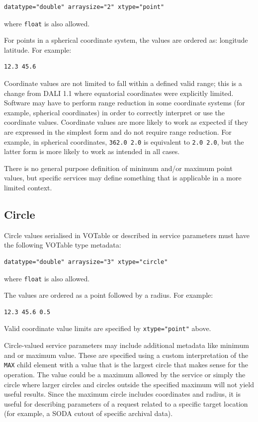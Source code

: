 \documentclass[11pt,letter]{ivoa}
\begin{document}
\begin{verbatim}
datatype="double" arraysize="2" xtype="point"
\end{verbatim}
\noindent where \verb|float| is also allowed.

For points in a spherical coordinate system, the values are ordered as: longitude latitude. For example:

\begin{verbatim}
12.3 45.6
\end{verbatim}

Coordinate values are not limited to fall within a defined valid range; this is a change from
DALI 1.1 where equatorial coordinates were explicitly limited. Software may have
to perform range reduction in some coordinate systems (for example, spherical coordinates) in
order to correctly interpret or use the coordinate values. Coordinate values are more likely to
work as expected if they are expressed in the simplest form and do not require range reduction.
For example, in spherical coordinates, \verb|362.0 2.0| is equivalent to \verb|2.0 2.0|, but the
latter form is more likely to work as intended in all cases.

There is no general purpose definition of minimum and/or maximum point values, but
specific services may define something that is applicable in a more limited context.

\subsection{Circle}
Circle values serialised in VOTable or described in service parameters must have the following VOTable type metadata:
\begin{verbatim}
datatype="double" arraysize="3" xtype="circle"
\end{verbatim}
\noindent where \verb|float| is also allowed.

The values are ordered as a point followed by a radius. For example:

\begin{verbatim}
12.3 45.6 0.5
\end{verbatim}

Valid coordinate value limits are specified by \verb|xtype="point"| above.

Circle-valued service parameters may include additional metadata like minimum and
or maximum value. These are specified using a custom interpretation of the
\verb|MAX| child element with a value that is the largest circle that makes sense
for the operation. The value could be a maximum allowed by the service or simply
the circle where larger circles and circles outside the specified maximum will not
yield useful results. Since the maximum circle includes coordinates and radius,
it is useful for describing parameters of a request related to a specific target
location (for example, a SODA cutout of specific archival data).
\end{document}
